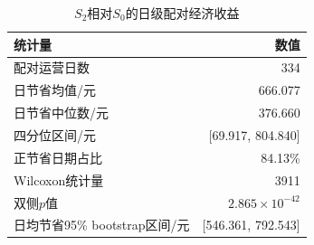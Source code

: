 \begin{table}[H]
\centering\small
\caption{$S_2$相对$S_0$的日级配对经济收益}\label{tab:q3-daily-value}
\setlength{\tabcolsep}{5pt}
\begin{tabular}{lr}
\toprule
统计量 & 数值 \\
\midrule
配对运营日数 & 334 \\
日节省均值/元 & 666.077 \\
日节省中位数/元 & 376.660 \\
四分位区间/元 & [69.917, 804.840] \\
正节省日期占比 & 84.13\% \\
Wilcoxon统计量 & 3911 \\
双侧$p$值 & $2.865\times10^{-42}$ \\
日均节省95\% bootstrap区间/元 & [546.361, 792.543] \\
\bottomrule
\end{tabular}
\end{table}
